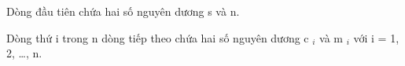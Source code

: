 Dòng đầu tiên chứa hai số nguyên dương s và n.

Dòng thứ i trong n dòng tiếp theo chứa hai số nguyên dương c $_ i $ và m $_ i $ với i = 1, 2, …, n.